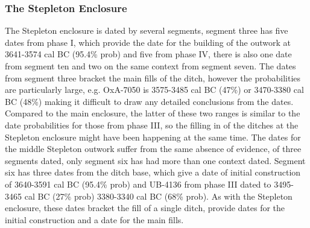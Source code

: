 \subsubsection{The Stepleton Enclosure}
The Stepleton enclosure is dated by several segments, segment three has five dates from phase I, which provide the date for the building of the outwork at 3641-3574 cal BC (95.4\% prob) and five from phase IV, there is also one date from segment ten and two on the same context from segment seven. The dates from segment three bracket the main fills of the ditch, however the probabilities are particularly large, e.g. OxA-7050 is 3575-3485 cal BC (47\%) or 3470-3380 cal BC (48\%) making it difficult to draw any detailed conclusions from the dates. Compared to the main enclosure, the latter of these two ranges is similar to the date probabilities for those from phase III, so the filling in of the ditches at the Stepleton enclosure might have been happening at the same time. The dates for the middle Stepleton outwork suffer from the same absence of evidence, of three segments dated, only segment six has had more than one context dated. Segment six has three dates from the ditch base, which give a date of initial construction of 3640-3591 cal BC (95.4\% prob) and UB-4136 from phase III dated to 3495-3465 cal BC (27\% prob) 3380-3340 cal BC (68\% prob). As with the Stepleton enclosure, these dates bracket the fill of a single ditch, provide dates for the initial construction and a date for the main fills.

